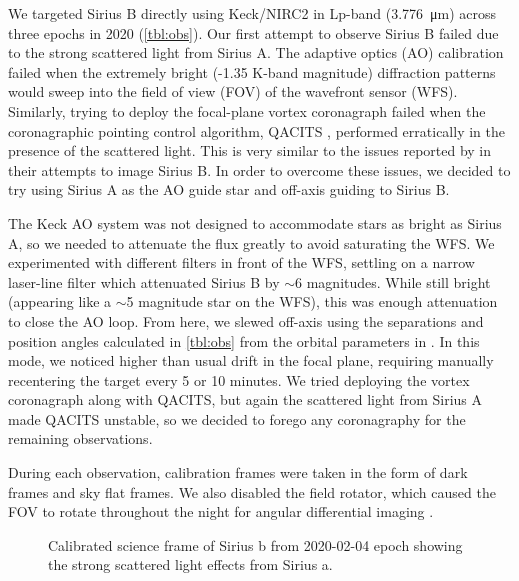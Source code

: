 \documentclass[twocolumn]{aastex631}
\begin{document}
We targeted Sirius B directly using Keck/NIRC2 in Lp-band (\qty{3.776}{\micro\meter}) across three epochs in 2020 (\autoref{tbl:obs}). Our first attempt to observe Sirius B failed due to the strong scattered light from Sirius A. The adaptive optics (AO) calibration failed when the extremely bright (-1.35 K-band magnitude) diffraction patterns would sweep into the field of view (FOV) of the wavefront sensor (WFS). Similarly, trying to deploy the focal-plane vortex coronagraph \citep{serabyn_w_2017} failed when the coronagraphic pointing control algorithm, QACITS \citep{huby_w_2017}, performed erratically in the presence of the scattered light. This is very similar to the issues reported by \citet[\S2]{vigan_high-contrast_2015} in their attempts to image Sirius B. In order to overcome these issues, we decided to try using Sirius A as the AO guide star and off-axis guiding to Sirius B.

The Keck AO system \citep{wizinowich_performance_2000} was not designed to accommodate stars as bright as Sirius A, so we needed to attenuate the flux greatly to avoid saturating the WFS. We experimented with different filters in front of the WFS, settling on a narrow laser-line filter which attenuated Sirius B by $\sim$6 magnitudes. While still bright (appearing like a $\sim$5 magnitude star on the WFS), this was enough attenuation to close the AO loop. From here, we slewed off-axis using the separations and position angles calculated in \autoref{tbl:obs} from the orbital parameters in \cite{bond_sirius_2017}. In this mode, we noticed higher than usual drift in the focal plane, requiring manually recentering the target every 5 or 10 minutes. We tried deploying the vortex coronagraph along with QACITS, but again the scattered light from Sirius A made QACITS unstable, so we decided to forego any coronagraphy for the remaining observations.

During each observation, calibration frames were taken in the form of dark frames and sky flat frames. We also disabled the field rotator, which caused the FOV to rotate throughout the night for angular differential imaging \citep[ADI;][]{marois_angular_2006}.

\begin{figure}
    \centering
    \caption{Calibrated science frame of Sirius b from 2020-02-04 epoch showing the strong scattered light effects from Sirius a.}
    \label{fig:spike}
\end{figure}
\end{document}
